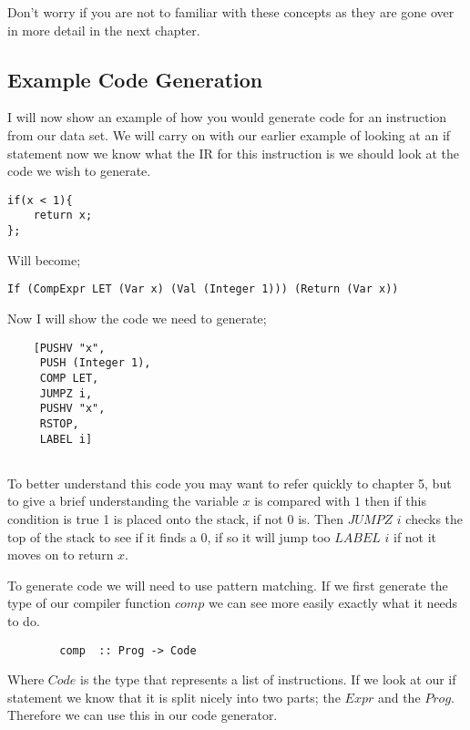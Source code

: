 Don't worry if you are not to familiar with these concepts as they are gone over in more detail in the next chapter.    

\newpage
 
\subsection{Example Code Generation}

I will now show an example of how you would generate code for an instruction from our data set. We will carry on with our earlier example of looking at an if statement now we know what the IR for this instruction is we should look at the code we wish to generate. 

\begin{lstlisting}
if(x < 1){
	return x;
};
\end{lstlisting}
Will become;

\begin{lstlisting}
If (CompExpr LET (Var x) (Val (Integer 1))) (Return (Var x))
\end{lstlisting}
	
Now I will show the code we need to generate;

\begin{lstlisting}
	[PUSHV "x",         
	 PUSH (Integer 1), 
	 COMP LET,         
	 JUMPZ i,           
	 PUSHV "x",
	 RSTOP,           
	 LABEL i]
	
\end{lstlisting}

To better understand this code you may want to refer quickly to chapter 5, but to give a brief understanding the variable $x$ is compared with $1$ then if this condition is true 1 is placed onto the stack, if not 0 is. Then $JUMPZ$ $i$ checks the top of the stack to see if it finds a 0, if so it will jump too $LABEL$ $i$ if not it moves on to return $x$. 

To generate code we will need to use pattern matching. If we first generate the type of our compiler function $comp$ we can see more easily exactly what it needs to do. 

\begin{lstlisting}
		comp  :: Prog -> Code
\end{lstlisting} 

Where $Code$ is the type that represents a list of instructions. If we look at our if statement we know that it is split nicely into two parts; the $Expr$ and the $Prog$. Therefore we can use this in our code generator. 

